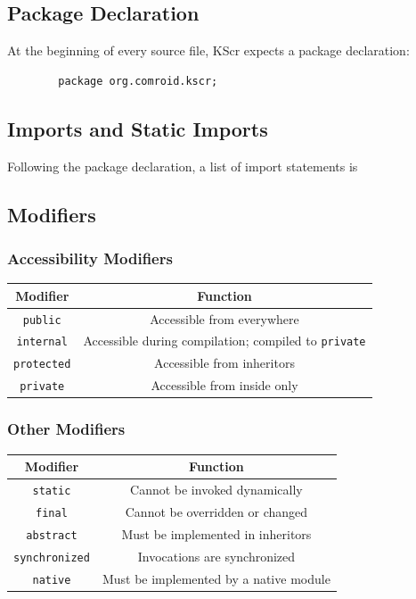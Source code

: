 \documentclass{docs}
\begin{document}
    \subsection{Package Declaration}
    At the beginning of every source file, KScr expects a package declaration:
    \begin{verbatim}
        package org.comroid.kscr;
    \end{verbatim}

    \subsection{Imports and Static Imports}
    Following the package declaration, a list of import statements is 

    \subsection{Modifiers}
    
    \subsubsection{Accessibility Modifiers}
    \begin{center}
    \begin{tabular}{c|c}
        Modifier & Function \\
        \hline
        \texttt{public} & Accessible from everywhere \\
        \texttt{internal} & Accessible during compilation; compiled to \texttt{private} \\
        \texttt{protected} & Accessible from inheritors \\
        \texttt{private} & Accessible from inside only
    \end{tabular}
    \end{center}
    
    \subsubsection{Other Modifiers}
    \begin{center}
    \begin{tabular}{c|c}
        Modifier & Function \\
        \hline
        \texttt{static} & Cannot be invoked dynamically \\
        \texttt{final} & Cannot be overridden or changed \\
        \texttt{abstract} & Must be implemented in inheritors \\
        \texttt{synchronized} & Invocations are synchronized \\
        \label{modNative}
        \texttt{native} & Must be implemented by a native module
    \end{tabular}
    \end{center}
    
\end{document}
